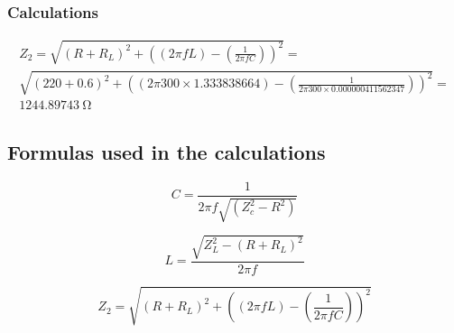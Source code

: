     \subsubsection*{Calculations}
\begin{multline}
	Z_2 = \sqrt{(R+R_L)^2 + \left(\left(2 \pi f L\right) - \left(\frac{1}{2 \pi f C}\right)\right)^2} = \\
	\sqrt{(220+0.6)^2 + \left(\left(2 \pi 300 \times 1.333838664\right) - \left(\frac{1}{2 \pi 300 \times 0.000000411562347}\right)\right)^2}= \\
	\SI{1244.89743}{\ohm}
\end{multline}
    


\subsection*{Formulas used in the calculations}


\begin{equation}
C = \frac{1}{2\pi f \sqrt{(Z_c^2 - R^2)}}
\end{equation}

\begin{equation}
	L = \frac{\sqrt{Z_L^2-(R+R_L)^2}}{2\pi f}
\end{equation}

\begin{equation}
	Z_2 = \sqrt{(R+R_L)^2 + \left(\left(2 \pi f L\right) - \left(\frac{1}{2 \pi f C}\right)\right)^2}
\end{equation}
